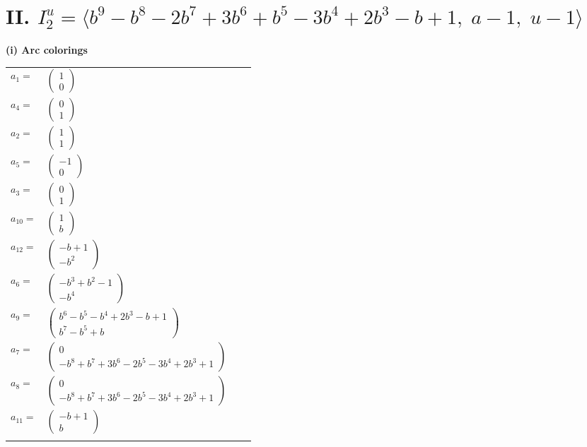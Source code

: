 \documentclass[1p]{elsarticle_modified}
\theoremstyle{definition}
\begin{document}
\centering \section*{II. $I^u_{2}= \langle b^9- b^8-2 b^7+3 b^6+b^5-3 b^4+2 b^3- b+1,\;a-1,\;u-1 \rangle$}
\flushleft \textbf{(i) Arc colorings}\\
\begin{tabular}{m{7pt} m{180pt} m{7pt} m{180pt} }
\flushright $a_{1}=$&$\begin{pmatrix}1\\0\end{pmatrix}$ \\
\flushright $a_{4}=$&$\begin{pmatrix}0\\1\end{pmatrix}$ \\
\flushright $a_{2}=$&$\begin{pmatrix}1\\1\end{pmatrix}$ \\
\flushright $a_{5}=$&$\begin{pmatrix}-1\\0\end{pmatrix}$ \\
\flushright $a_{3}=$&$\begin{pmatrix}0\\1\end{pmatrix}$ \\
\flushright $a_{10}=$&$\begin{pmatrix}1\\b\end{pmatrix}$ \\
\flushright $a_{12}=$&$\begin{pmatrix}- b+1\\- b^2\end{pmatrix}$ \\
\flushright $a_{6}=$&$\begin{pmatrix}- b^3+b^2-1\\- b^4\end{pmatrix}$ \\
\flushright $a_{9}=$&$\begin{pmatrix}b^6- b^5- b^4+2 b^3- b+1\\b^7- b^5+b\end{pmatrix}$ \\
\flushright $a_{7}=$&$\begin{pmatrix}0\\- b^8+b^7+3 b^6-2 b^5-3 b^4+2 b^3+1\end{pmatrix}$ \\
\flushright $a_{8}=$&$\begin{pmatrix}0\\- b^8+b^7+3 b^6-2 b^5-3 b^4+2 b^3+1\end{pmatrix}$ \\
\flushright $a_{11}=$&$\begin{pmatrix}- b+1\\b\end{pmatrix}$\\&\end{tabular}
\end{document}
